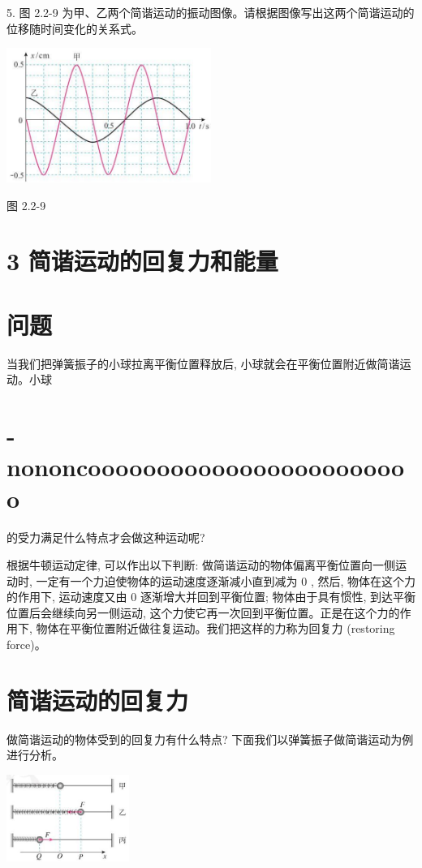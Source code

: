 \documentclass[10pt]{article}
\begin{document}
5. 图 2.2-9 为甲、乙两个简谐运动的振动图像。请根据图像写出这两个简谐运动的位移随时间变化的关系式。

\begin{center}
\includegraphics[max width=0.5\textwidth]{images/01910e4c-ebb8-7d2c-8f2f-2375bc1d2d12_47_456079.jpg}
\end{center}

图 2.2-9

\section*{3 简谐运动的回复力和能量}

\section*{问题}

当我们把弹簧振子的小球拉离平衡位置释放后, 小球就会在平衡位置附近做简谐运动。小球

\section*{-nononcoooooooooooooooooooooooo}

的受力满足什么特点才会做这种运动呢?

根据牛顿运动定律, 可以作出以下判断: 做简谐运动的物体偏离平衡位置向一侧运动时, 一定有一个力迫使物体的运动速度逐渐减小直到减为 0 , 然后, 物体在这个力的作用下, 运动速度又由 0 逐渐增大并回到平衡位置; 物体由于具有惯性, 到达平衡位置后会继续向另一侧运动, 这个力使它再一次回到平衡位置。正是在这个力的作用下, 物体在平衡位置附近做往复运动。我们把这样的力称为回复力 (restoring force)。

\section*{简谐运动的回复力}

做简谐运动的物体受到的回复力有什么特点? 下面我们以弹簧振子做简谐运动为例进行分析。

\begin{center}
\includegraphics[max width=0.3\textwidth]{images/01910e4c-ebb8-7d2c-8f2f-2375bc1d2d12_48_622839.jpg}
\end{center}
\end{document}
